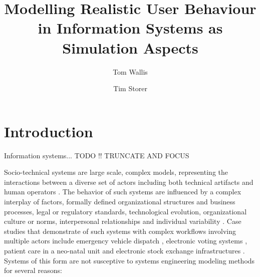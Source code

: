 \documentclass{llncs}
\title{Modelling Realistic User Behaviour in Information Systems as Simulation Aspects}
\author{Tom Wallis\orcidID{} \and Tim Storer\orcidID{}}
\institute{University of Glasgow, Glasgow, Scotland,\\
  \email{twallisgm@gmail.com},\\
  \email{timothy.storer@glasgow.ac.uk},
}
\begin{document}

\maketitle


\begin{abstract}

\end{abstract}


\section{Introduction}
\label{sec:introduction}


Information systems... TODO !! TRUNCATE AND FOCUS

Socio-technical systems are large scale, complex models, representing the interactions between a diverse set of actors
including both technical artifacts and human operators \citep{elhassan07role,sommerville08socio,susman1976autonomy}.  The
behavior of such systems are influenced by a complex interplay of factors, formally defined organizational structures
and business processes, legal or regulatory standards, technological evolution, organizational culture or norms,
interpersonal relationships and individual variability \citep{bade07structures,pentland05organisational}. Case studies
that demonstrate of such systems with complex workflows involving multiple actors include emergency vehicle dispatch
\cite{robinson96limited}, electronic voting systems \citep{bryans04towards,lock07observations}, patient care in a
neo-natal unit \citep{baxter07evaluating} and electronic stock exchange infrastructures \citep{cftc-sec10findings}.
Systems of this form are not susceptive to systems engineering modeling methods for several reasons:
\end{document}
